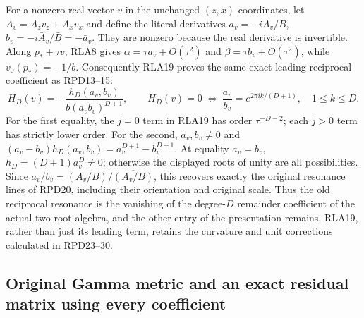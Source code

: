 \documentclass[11pt]{article}
\begin{document}
For a nonzero real vector $v$ in the unchanged $(z,x)$ coordinates,
let $A_v=A_zv_z+A_xv_x$ and define the literal derivatives
$a_v=-iA_v/B$, $b_v=-i\bar A_v/\bar B=-\bar a_v$.
They are nonzero because the real derivative is invertible.  Along
$p_*+\tau v$, RLA8 gives
$\alpha=\tau a_v+O(\tau^2)$ and
$\beta=\tau b_v+O(\tau^2)$, while $v_0(p_*)=-1/b$.
Consequently RLA19 proves the same exact leading reciprocal
coefficient as RPD13--15:
\[
 H_D(v)=-\frac{h_D(a_v,b_v)}{b(a_vb_v)^{D+1}},\qquad
 H_D(v)=0\ \Longleftrightarrow\
 \frac{a_v}{b_v}=e^{2\pi ik/(D+1)},\quad1\le k\le D.
 \tag{RLA20}
\]
For the first equality, the $j=0$ term in RLA19 has order
$\tau^{-D-2}$; each $j>0$ term has strictly lower order.
For the second, $a_v,b_v\ne0$ and
$(a_v-b_v)h_D(a_v,b_v)=a_v^{D+1}-b_v^{D+1}$.
At equality $a_v=b_v$, $h_D=(D+1)a_v^D\ne0$; otherwise the
displayed roots of unity are all possibilities.
Since $a_v/b_v=(A_v/B)/\overline{(A_v/B)}$, this recovers exactly
the original resonance lines of RPD20, including their orientation
and original scale.  Thus the old reciprocal resonance is the
vanishing of the degree-$D$ remainder coefficient of the actual
two-root algebra, and the other entry of the presentation remains.
RLA19, rather than just its leading term, retains the curvature
and unit corrections calculated in RPD23--30.

\subsection{Original Gamma metric and an exact residual matrix using every coefficient}
\end{document}
